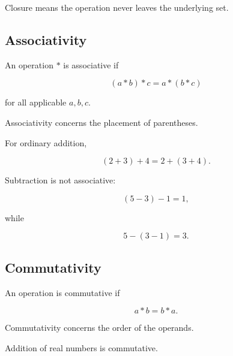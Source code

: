 \begin{center}
\end{center}

Closure means the operation never leaves the underlying set.

\subsection{Associativity}
\label{subsec:associativity-abstract}

An operation \(*\) is associative if

\[ (a*b)*c=a*(b*c) \]

for all applicable \(a,b,c\).

Associativity concerns the placement of parentheses.

For ordinary addition,

\[ (2+3)+4=2+(3+4). \]

Subtraction is not associative:

\[ (5-3)-1=1, \]

while

\[ 5-(3-1)=3. \]

\subsection{Commutativity}
\label{subsec:commutativity-abstract}

An operation is commutative if

\[ a*b=b*a. \]

Commutativity concerns the order of the operands.

Addition of real numbers is commutative.

